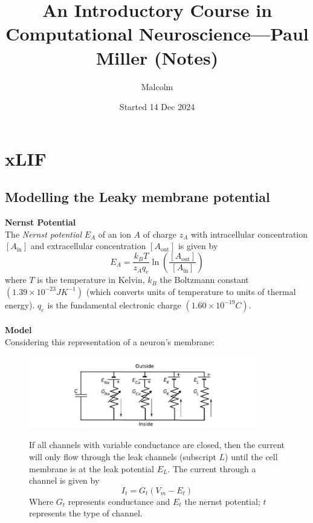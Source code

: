 \documentclass{report}
\title{An Introductory Course in Computational Neuroscience---Paul Miller (Notes)}
\date{Started 14 Dec 2024}
\author{Malcolm}
\begin{document}
\maketitle
\tableofcontents
\newpage

\section{xLIF}
\subsection{Modelling the Leaky membrane potential}
\textbf{Nernst Potential}\\
The \textit{Nernst potential} $E_A$ of an ion $A$ of charge $z_A$ with intracellular concentration $[A_{\text{in}}]$ and extracellular concentration $[A_{\text{out}}]$ is given by
\begin{equation*}
E_A=\frac{k_BT}{z_Aq_e}\ln\left(\frac{[A_{\text{out}}]}{[A_{\text{in}}]}\right)
\end{equation*}
where $T$ is the temperature in Kelvin, $k_B$ the Boltzmann constant $(1.39\times10^{-23}JK^{-1})$ (which converts units of temperature to units of thermal energy). $q_e$ is the fundamental electronic charge
$(1.60\times10^{-19}C)$.\\
\vspace{1mm}\\
\textbf{Model}\\
Considering this representation of a neuron's membrane:
\begin{figure}[h]
\begin{center}
\includegraphics[width=10cm]{1}\\
\end{center}
If all channels with variable conductance are closed, then the current will only flow through the leak channels (subscript $L$) until the cell membrane is at the leak
potential $E_L$. The current through a channel is given by
\begin{equation*}
I_t=G_t(V_m-E_t)
\end{equation*}
Where $G_t$ represents conductance and $E_t$ the nernst potential; $t$ represents the type of channel.
\end{figure}\\
\end{document}
